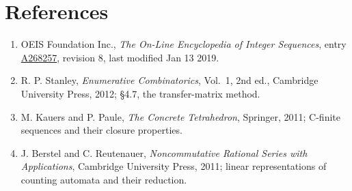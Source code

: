 \documentclass[11pt]{article}
\theoremstyle{definition}
\begin{document}
\section{References}

\begin{enumerate}

\item OEIS Foundation Inc., \emph{The On-Line Encyclopedia of Integer Sequences}, entry \href{https://oeis.org/A268257}{A268257}, revision 8, last modified Jan 13 2019.

\item R. P. Stanley, \emph{Enumerative Combinatorics}, Vol.~1, 2nd ed., Cambridge University Press, 2012; \S4.7, the transfer-matrix method.

\item M. Kauers and P. Paule, \emph{The Concrete Tetrahedron}, Springer, 2011; C-finite sequences and their closure properties.

\item J. Berstel and C. Reutenauer, \emph{Noncommutative Rational Series with Applications}, Cambridge University Press, 2011; linear representations of counting automata and their reduction.

\end{enumerate}
\end{document}

